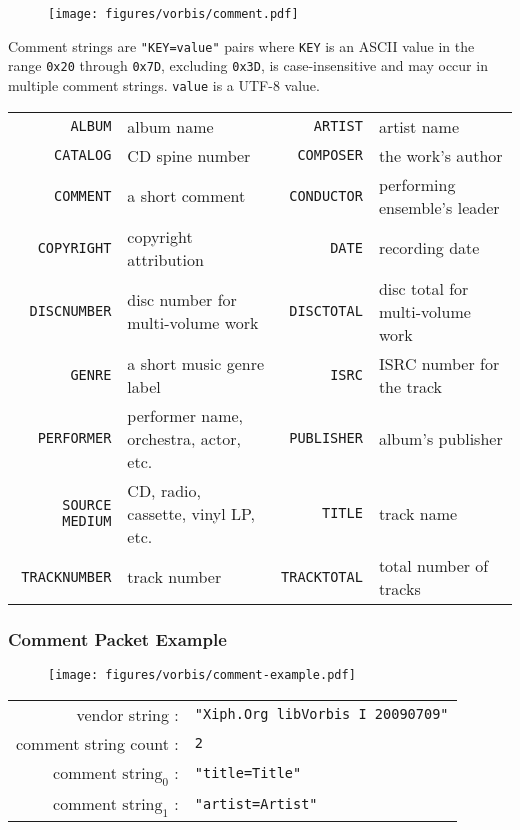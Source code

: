 \begin{figure}[h]
\texttt{[image: figures/vorbis/comment.pdf]}
\end{figure}
\par
\noindent
Comment strings are \texttt{"KEY=value"} pairs
where \texttt{KEY} is an ASCII value in the range \texttt{0x20}
through \texttt{0x7D}, excluding \texttt{0x3D},
is case-insensitive and may occur in multiple comment strings.
\texttt{value} is a UTF-8 value.
\begin{table}[h]
{
  \begin{tabular}{rlrl}
    \texttt{ALBUM} & album name &
    \texttt{ARTIST} & artist name \\
    \texttt{CATALOG} & CD spine number &
    \texttt{COMPOSER} & the work's author \\
    \texttt{COMMENT} & a short comment &
    \texttt{CONDUCTOR} & performing ensemble's leader \\
    \texttt{COPYRIGHT} & copyright attribution &
    \texttt{DATE} & recording date \\
    \texttt{DISCNUMBER} & disc number for multi-volume work &
    \texttt{DISCTOTAL} & disc total for multi-volume work \\
    \texttt{GENRE} & a short music genre label &
    \texttt{ISRC} & ISRC number for the track \\
    \texttt{PERFORMER} & performer name, orchestra, actor, etc. &
    \texttt{PUBLISHER} & album's publisher \\
    \texttt{SOURCE MEDIUM} & CD, radio, cassette, vinyl LP, etc. &
    \texttt{TITLE} & track name \\
    \texttt{TRACKNUMBER} & track number &
    \texttt{TRACKTOTAL} & total number of tracks \\
  \end{tabular}
}
\end{table}

\clearpage

\subsubsection{Comment Packet Example}

\begin{figure}[h]
  \texttt{[image: figures/vorbis/comment-example.pdf]}
\end{figure}
\begin{table}[h]
\begin{tabular}{rl}
  vendor string : & \texttt{"Xiph.Org libVorbis I 20090709"} \\
  comment string count : & \texttt{2} \\
  $\text{comment string}_0$ : & \texttt{"title=Title"} \\
  $\text{comment string}_1$ : & \texttt{"artist=Artist"} \\
\end{tabular}
\end{table}

